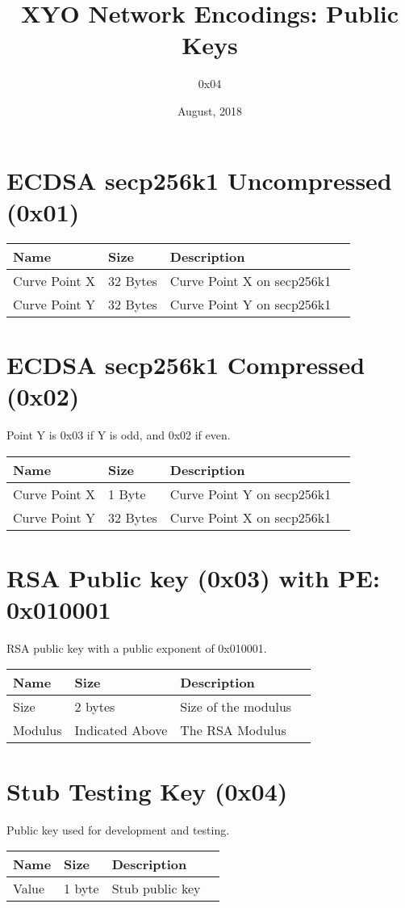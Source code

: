 \documentclass[11pt]{article}
\title{XYO Network Encodings: Public Keys}
\author{0x04}
\date{August, 2018}
\begin{document}
\maketitle

\section{ECDSA secp256k1 Uncompressed (0x01)}

\begin{center}
\begin{tabular}{ |l|l|l|l| } 
\hline
\textbf{Name} & \textbf{Size} & \textbf{Description}\\
\hline
Curve Point X & 32 Bytes & Curve Point X on secp256k1\\
Curve Point Y & 32 Bytes & Curve Point Y on secp256k1\\ 
   
\hline
\end{tabular}
\end{center}

\section{ECDSA secp256k1 Compressed (0x02)}
Point Y is 0x03 if Y is odd, and 0x02 if even.

\begin{center}
\begin{tabular}{ |l|l|l|l| } 
\hline
\textbf{Name} & \textbf{Size} & \textbf{Description}\\
\hline
Curve Point X & 1 Byte & Curve Point Y on secp256k1\\
Curve Point Y & 32 Bytes & Curve Point X on secp256k1\\ 
   
\hline
\end{tabular}
\end{center}

\section{RSA Public key (0x03) with PE: 0x010001}
RSA public key with a public exponent of 0x010001.

\begin{center}
\begin{tabular}{ |l|l|l|l| } 
\hline
\textbf{Name} & \textbf{Size} & \textbf{Description}\\
\hline
Size & 2 bytes & Size of the modulus \\
Modulus & Indicated Above & The RSA Modulus\\ 
   
\hline
\end{tabular}
\end{center}

\section{Stub Testing Key (0x04)}
Public key used for development and testing.

\begin{center}
\begin{tabular}{ |l|l|l|l| } 
\hline
\textbf{Name} & \textbf{Size} & \textbf{Description}\\
\hline
Value & 1 byte & Stub public key \\
   
\hline
\end{tabular}
\end{center}
\end{document}
